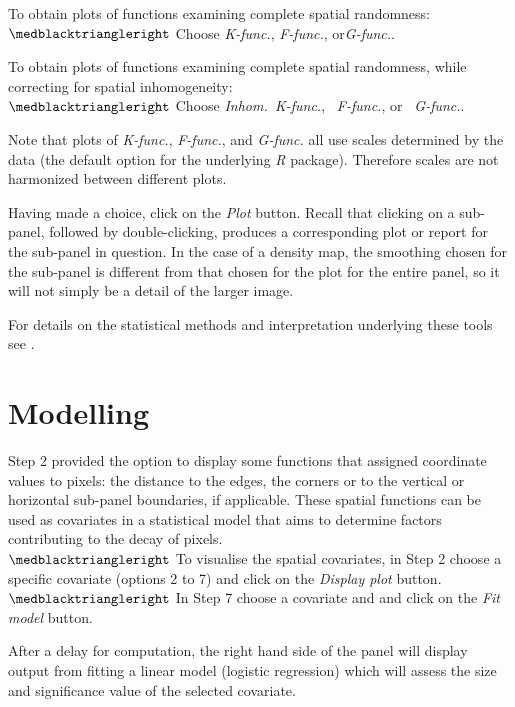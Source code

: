 \documentclass[11pt,a4paper]{article}
\newcommand{\Rsoftware}{\emph{R}\xspace}
\begin{document}
To obtain plots of functions examining complete spatial randomness:\\ 
$\medblacktriangleright$ Choose \emph{K-func.}, 
\emph{F-func.}, or\emph{G-func.}.

To obtain plots of functions examining complete spatial randomness, while correcting for spatial inhomogeneity:\\ 
$\medblacktriangleright$ Choose \emph{Inhom.~K-func.}, 
\emph{~F-func.}, or \emph{~G-func.}.

Note that plots of \emph{K-func.}, 
\emph{F-func.}, and \emph{G-func.}
all use scales determined by the data
(the default option for the underlying \Rsoftware package).
Therefore scales are not harmonized between different plots.

Having made a choice, click on the \emph{Plot} button.
Recall that clicking on a sub-panel, followed by double-clicking,
produces a corresponding plot or report 
for the sub-panel in question.
In the case of a density map, the smoothing 
chosen for the sub-panel is different
from that chosen for the plot for the entire panel,
so it will not simply be a detail of the larger image.

For details on the statistical methods and interpretation underlying these tools see \cite{brettschneider2017crism}.


\section{Modelling}\label{model}

Step 2 provided the option to display some functions that assigned coordinate values to pixels: the distance to the edges, the corners or to the vertical or horizontal sub-panel boundaries, if applicable. These spatial functions can be used as covariates in a statistical model that aims to determine factors contributing to the decay of pixels. \\
$\medblacktriangleright$ To visualise the spatial covariates, in Step 2 choose a specific covariate
(options 2 to 7) and click on the \emph{Display plot} button.\\
$\medblacktriangleright$ In Step 7 choose a covariate and and click on the \emph{Fit model} button.

After a delay for computation,
the right hand side of the panel will display 
output from fitting a linear model (logistic regression) which will assess the size and significance value of the selected covariate. 
\end{document}
